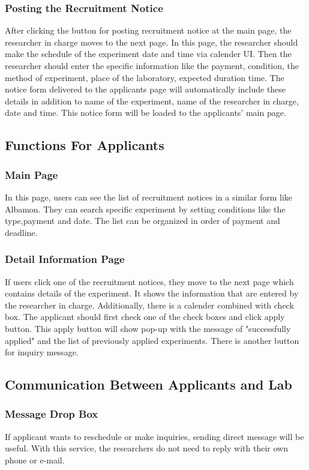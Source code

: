 \documentclass[letterpaper, 10 pt, conference]{ieeeconf}  %
\begin{document}
\subsubsection{Posting the Recruitment Notice}
After clicking the button for posting recruitment notice at the main page, the researcher in charge moves to the next page. In this page, the researcher should make the schedule of the experiment date and time via calender UI. Then the researcher should enter the specific information like the payment, condition, the method of experiment, place of the laboratory, expected duration time. The notice form delivered to the applicants page will automatically include these details in addition to name of the experiment, name of the researcher in charge, date and time. This notice form will be loaded to the applicants' main page.

\subsection{Functions For Applicants}
\subsubsection{Main Page}
In this page, users can see the list of recruitment notices in a similar form like Albamon. They can search specific experiment by setting conditions like the type,payment and date. The list can be organized in order of payment and deadline.
\subsubsection{Detail Information Page}
If users click one of the recruitment notices, they move to the next page which contains details of the experiment. It shows the information that are entered by the researcher in charge. Additionally, there is a calender combined with check box. The applicant should first check one of the check boxes and click apply button. This apply button will show pop-up with the message of "successfully applied" and the list of previously applied experiments. There is another button for inquiry message.



\subsection{Communication Between Applicants and Lab}
\subsubsection{Message Drop Box}
If applicant wants to reschedule or make inquiries, sending direct message will be useful. With this service, the researchers do not need to reply with their own phone or e-mail. 
\end{document}
